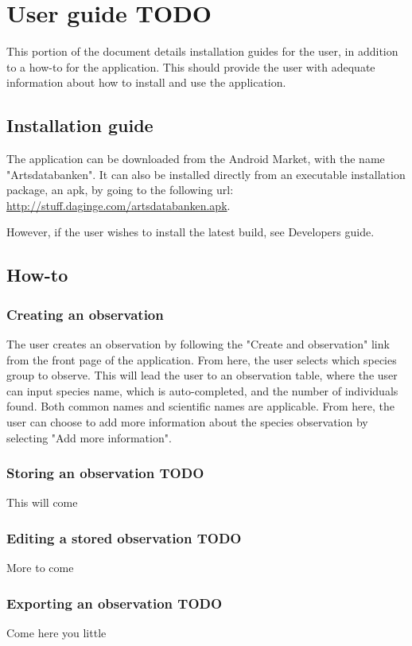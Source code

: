 \newpage
\section{User guide TODO}
This portion of the document details installation guides for the user, in addition to a how-to for the application. This should provide the user with adequate information about how to install and use the application.
\subsection{Installation guide}
The application can be downloaded from the Android Market, with the name "Artsdatabanken". It can also be installed directly from an executable installation package, an apk, by going to the following url: \url{http://stuff.daginge.com/artsdatabanken.apk}.

However, if the user wishes to install the latest build, see Developers guide.

\subsection{How-to}
\subsubsection{Creating an observation}
The user creates an observation by following the "Create and observation" link from the front page of the application. From here, the user selects which species group to observe. This will lead the user to an observation table, where the user can input species name, which is auto-completed, and the number of individuals found. Both common names and scientific names are applicable. From here, the user can choose to add more information about the species observation by selecting "Add more information".

\subsubsection{Storing an observation TODO}
This will come

\subsubsection{Editing a stored observation TODO}
More to come

\subsubsection{Exporting an observation TODO}
Come here you little

